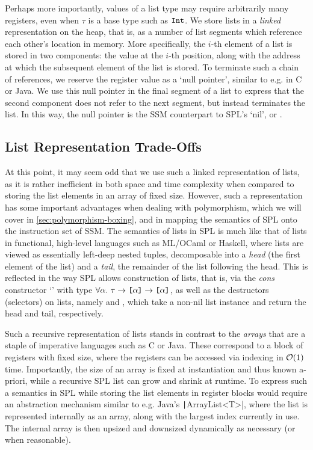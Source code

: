 Perhaps more importantly, values of a list type \code{[$\tau$]} may require
arbitrarily many registers, even when $\tau$ is a base type such as $\texttt{Int}$.
We store lists in a \emph{linked} representation on the heap, that is, as a
number of list segments which reference each other's location in memory.
More specifically, the $i$-th element of a list is stored in two components: the
value at the $i$-th position, along with the address at which the subsequent
element of the list is stored.
To terminate such a chain of references, we reserve the register value
 as a `null pointer', similar to e.g.  in C or Java.
We use this null pointer in the final segment of a list to express that the
second component does not refer to the next segment, but instead terminates the
list. In this way, the null pointer is the SSM counterpart to SPL's `nil', or
\spl{[]}.

\subsection{List Representation Trade-Offs}
At this point, it may seem odd that we use such a linked representation of
lists, as it is rather inefficient in both space and time complexity when
compared to storing the list elements in an array of fixed size.
However, such a representation has some important advantages when dealing with
polymorphism, which we will cover in \cref{sec:polymorphism-boxing}, and in
mapping the semantics of SPL onto the instruction set of SSM.
The semantics of lists in SPL is much like that of lists in functional,
high-level languages such as ML/OCaml or Haskell, where lists are viewed as
essentially left-deep nested tuples, decomposable into a \emph{head} (the first
element of the list) and a \emph{tail}, the remainder of the list following the
head. This is reflected in the way SPL allows construction of lists, that is,
via the \emph{cons} constructor `\spl{:}' with type
$\forall \alpha.\ \tau \to \TList{\alpha} \to \TList{\alpha}$, as well as the
destructors (selectors) on lists, namely  and , which take a
non-nil list instance and return the head and tail, respectively.

Such a recursive representation of lists stands in contrast to the \emph{arrays}
that are a staple of imperative languages such as C or Java. These correspond
to a block of registers with fixed size, where the registers can be
accessed via indexing in $\mathcal{O}(1)$ time.
Importantly, the size of an array is fixed at instantiation and thus known
a-priori, while a recursive SPL list can grow and shrink at runtime. To express
such a semantics in SPL while storing the list elements in register blocks would
require an abstraction mechanism similar to e.g. Java's
\texttt|ArrayList<T>|, where the list is represented internally as an
array, along with the largest index currently in use. The internal array is then
upsized and downsized dynamically as necessary (or when reasonable).

